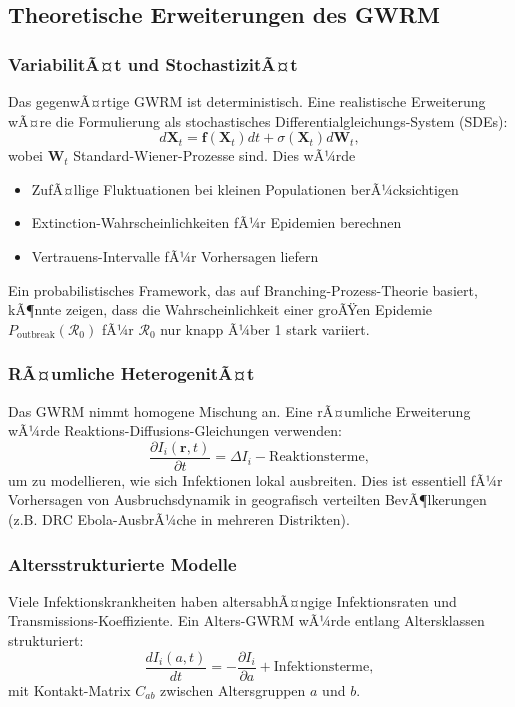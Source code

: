 ﻿\documentclass[a4paper,12pt]{article}
\theoremstyle{definition}
\begin{document}
\subsection{Theoretische Erweiterungen des GWRM}

\subsubsection{VariabilitÃ¤t und StochastizitÃ¤t}
Das gegenwÃ¤rtige GWRM ist deterministisch. Eine realistische Erweiterung wÃ¤re die Formulierung als stochastisches Differentialgleichungs-System (SDEs):
\[
d\mathbf{X}_t = \mathbf{f}(\mathbf{X}_t) dt + \sigma(\mathbf{X}_t) d\mathbf{W}_t,
\]
wobei $\mathbf{W}_t$ Standard-Wiener-Prozesse sind. Dies wÃ¼rde
\begin{itemize}
\item ZufÃ¤llige Fluktuationen bei kleinen Populationen berÃ¼cksichtigen
\item Extinction-Wahrscheinlichkeiten fÃ¼r Epidemien berechnen
\item Vertrauens-Intervalle fÃ¼r Vorhersagen liefern
\end{itemize}

Ein probabilistisches Framework, das auf Branching-Prozess-Theorie basiert, kÃ¶nnte zeigen, dass die Wahrscheinlichkeit einer groÃŸen Epidemie $P_{\text{outbreak}}(\mathcal{R}_0)$ fÃ¼r $\mathcal{R}_0$ nur knapp Ã¼ber 1 stark variiert.

\subsubsection{RÃ¤umliche HeterogenitÃ¤t}
Das GWRM nimmt homogene Mischung an. Eine rÃ¤umliche Erweiterung wÃ¼rde Reaktions-Diffusions-Gleichungen verwenden:
\[
\frac{\partial I_i(\mathbf{r}, t)}{\partial t} = \Delta I_i - \text{Reaktionsterme},
\]
um zu modellieren, wie sich Infektionen lokal ausbreiten. Dies ist essentiell fÃ¼r Vorhersagen von Ausbruchsdynamik in geografisch verteilten BevÃ¶lkerungen (z.B. DRC Ebola-AusbrÃ¼che in mehreren Distrikten).

\subsubsection{Altersstrukturierte Modelle}
Viele Infektionskrankheiten haben altersabhÃ¤ngige Infektionsraten und Transmissions-Koeffiziente. Ein Alters-GWRM wÃ¼rde entlang Altersklassen strukturiert:
\[
\frac{dI_i(a,t)}{dt} = -\frac{\partial I_i}{\partial a} + \text{Infektionsterme},
\]
mit Kontakt-Matrix $C_{ab}$ zwischen Altersgruppen $a$ und $b$.
\end{document}
